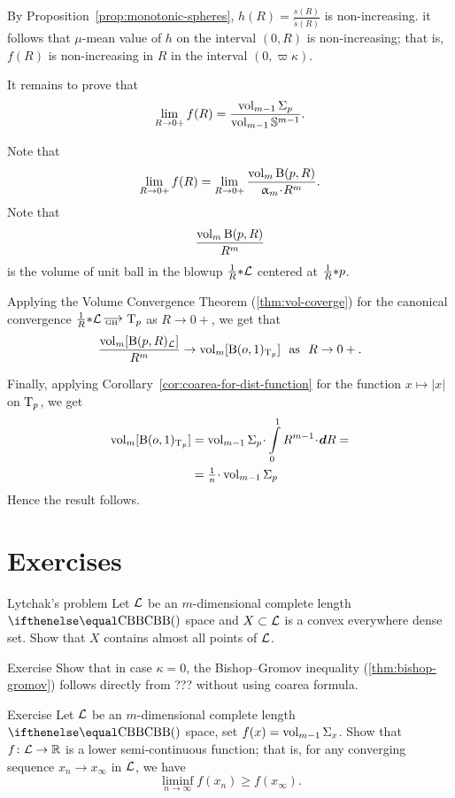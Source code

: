 By Proposition~\ref{prop:monotonic-spheres}, 
$h(R)= \frac {s(R)}{\tilde s(R)}$ is non-increasing.
it follows that $\mu$-mean value of $h$ on the interval  $(0,R)$ 
is non-increasing;
that is, $f(R)$ is non-increasing in $R$ in the interval $(0,\varpi\kappa)$.




It remains to prove that 
\[\lim_{R\to0+}f(R)
=
\frac{\vol_{m-1}\Sigma_p}{\vol_{m-1} \mathbb{S}^{m-1}}.\]

Note that
\[\lim_{R\to0+}f(R)=\lim_{R\to0+} \frac{\vol_m\oBall(p,R)}{\alpha_m\cdot R^{ m}}.\]
Note that 
\[\frac{\mathop{\rm vol}\nolimits_m\mathrm{B}{}(p,R)}{R^{m}}\]
is the volume of unit ball in the blowup 
$\tfrac1R{*} \mathcal{L}$ centered at $\tfrac1R{*} p$.

Applying the Volume Convergence Theorem (\ref{thm:vol-coverge})
for the canonical convergence $\tfrac1R\blow\spc{L}\GHto \T_p$ as $R\to 0+$,
we get that 
\[\frac{\vol_m[\oBall(p,R)_{\spc{L}}]}{R^m}
\to
\vol_m[\oBall(o,1)_{\T_p}]\ \ \text{as} \ \ R\to0+.\]

Finally, applying Corollary~\ref{cor:coarea-for-dist-function}
for the function $x\mapsto |x|$ on $\text{\rm T}_p$, we get
\begin{align*}
\vol_m[\oBall(o,1)_{\T_p}]
&=
\vol_{m-1}\Sigma_p\cdot\int\limits_0^1 R^{m-1}\cdot\dd R=
\\
&=\tfrac1n\cdot\vol_{m-1}\Sigma_p
\end{align*}
Hence the result follows.
\qeds

\section{Exercises}


\begin{thm}{Lytchak's problem}
Let $\mathcal{L}$ be an $m$-dimensional complete length $\Alex{}$ space and $X\subset\spc{L}$ is a convex everywhere dense set.
Show that $X$ contains almost all points  of $\mathcal{L}$.
\end{thm}


\begin{thm}{Exercise}
Show that in case $\kappa=0$,
the Bishop--Gromov inequality (\ref{thm:bishop-gromov})
follows directly from ??? without using coarea formula.
\end{thm}

\begin{thm}{Exercise}
Let $\mathcal{L}$ be an $m$-dimensional complete length $\Alex{}$ space,
set $f(x)=\mathop{\rm vol}\nolimits_{m-1}\Sigma_x$.
Show that $f\:\spc{L}\to\RR$ is a lower semi-continuous function;
that is, for any converging sequence $x_n\to x_\infty$ in $\mathcal{L}$,
we have 
\[\liminf_{n\to\infty}f(x_n)\ge f(x_\infty).\]
\end{thm}

